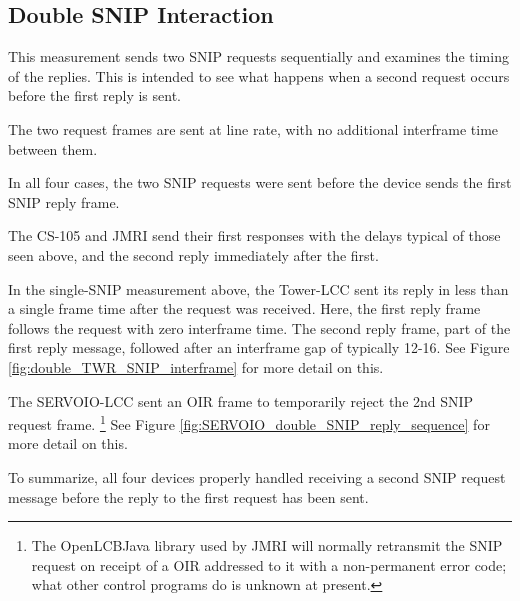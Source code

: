 \documentclass[11pt]{article}
\begin{document}
\clearpage



\subsection{Double SNIP Interaction}

This measurement sends two SNIP requests sequentially and examines the timing of the replies.
This is intended to see what happens when a second request occurs before the first reply is sent.

The two request frames are sent at line rate, with no additional interframe time
between them.

In all four cases, the two SNIP requests were sent before the device sends the first 
SNIP reply frame.

The CS-105 and JMRI send their first responses with the delays typical of those seen 
above, and the second reply immediately after the first. 

In the single-SNIP measurement above, the Tower-LCC sent its reply in less than a single frame time
after the request was received.  
Here, the first reply frame follows the request with zero interframe time. 
The second reply frame, part of the first reply message, followed after
an interframe gap of typically 12-16\us.
See Figure \ref{fig:double_TWR_SNIP_interframe} for more detail on this.

The SERVOIO-LCC sent an OIR frame to temporarily reject the 2nd SNIP request
frame.
\footnote{The OpenLCB\textunderscore  Java library used by JMRI will 
    normally retransmit the SNIP request on receipt
    of a OIR addressed to it with a non-permanent error code; 
    what other control programs do is unknown at present.
}
See Figure \ref{fig:SERVOIO_double_SNIP_reply_sequence} for more detail on this.

To summarize, all four devices properly handled receiving a second SNIP request
message before the reply to the first request has been sent.
\end{document}
